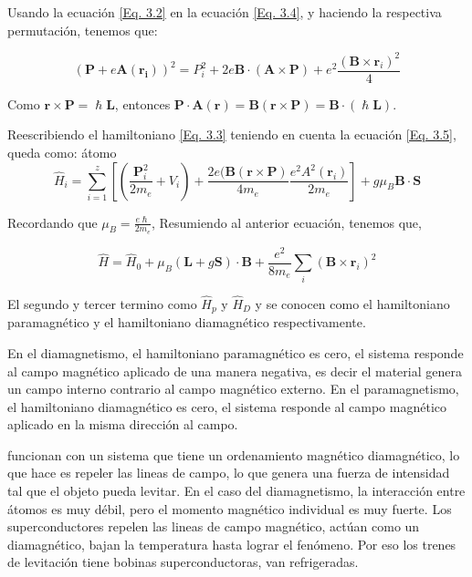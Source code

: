 \documentclass[11pt,fleqn]{book}
\renewcommand{\vec}[1]{\mathbf{#1}}
\begin{document}
Usando la ecuación \ref{Eq. 3.2} en la ecuación \ref{Eq. 3.4}, y haciendo la respectiva permutación, tenemos que:

\begin{equation}
    \left(\vec{P}+e\vec{A(\vec{r}_{i})}\right)^{2}=P_{i}^{2}+2e\vec{B}\cdot(\vec{A}\times\vec{P})+e^{2}\frac{\left(\vec{B}\times\vec{r}_{i}\right)^{2}}{4}
    \label{Eq. 3.5}
\end{equation}

Como $\vec{r}\times\vec{P}=\hslash\vec{L}$, entonces $\vec{P}\cdot\vec{A}(\vec{r})=\vec{B}(\vec{r}\times\vec{P})=\vec{B}\cdot(\hslash\vec{L})$.

Reescribiendo el hamiltoniano \ref{Eq. 3.3} teniendo en cuenta la ecuación \ref{Eq. 3.5}, queda como:
átomo
\begin{equation*}
     \hat{H}_{i}=\sum_{i=1}^{z}\left[\left(\frac{\vec{P}_{i}^{2}}{2m_{e}}+V_{i}\right)+\frac{2e(\vec{B}(\vec{r}\times\vec{P})}{4m_{e}}\frac{e^{2}A^{2}(\vec{r}_{i})}{2m_{e}}\right]+ g\mu_{B}\vec{B}\cdot\vec{S}
\end{equation*}

Recordando que $\mu_{B}=\frac{e\hslash}{2m_{e}}$, Resumiendo al anterior ecuación, tenemos que,

\begin{equation}
    \hat{H}=\hat{H}_{0}+\mu_{B}(\vec{L}+g\vec{S})\cdot\vec{B}+\frac{e^{2}}{8m_{e}}\sum_{i}(\vec{B}\times\vec{r}_{i})^{2}
    \label{Eq- 3.6}
\end{equation}

El segundo y tercer termino como $\hat{H}_{p}$ y $\hat{H}_{D}$ y se conocen como el hamiltoniano paramagnético y el hamiltoniano diamagnético respectivamente. 

En el diamagnetismo, el hamiltoniano paramagnético es cero, el sistema responde al campo magnético aplicado de una manera negativa, es decir el material genera un campo interno contrario al campo magnético externo. En el paramagnetismo, el hamiltoniano diamagnético es cero, el sistema responde al campo magnético aplicado en la misma dirección al campo. 

\begin{example}
funcionan con un sistema que tiene un ordenamiento magnético diamagnético, lo que hace es repeler las lineas de campo, lo que genera una fuerza de intensidad tal que el objeto pueda levitar. En el caso del diamagnetismo, la interacción entre átomos es muy débil, pero el momento magnético individual es muy fuerte. Los superconductores repelen las lineas de campo magnético, actúan como un diamagnético, bajan la temperatura hasta lograr el fenómeno. Por eso los trenes de levitación tiene bobinas superconductoras, van refrigeradas.
\end{example}
\end{document}
